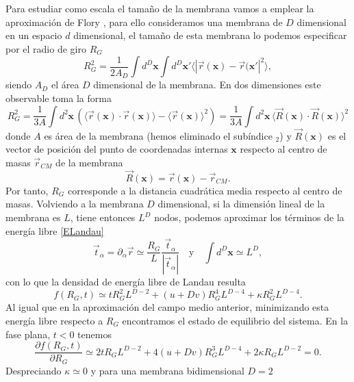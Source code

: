 Para estudiar como escala el tamaño de la membrana vamos a emplear la
aproximación de Flory \cite{Gennes:Scaling}, para ello consideramos una
membrana de $D$ dimensional en un espacio 
$d$ dimensional, el tamaño de esta membrana lo podemos especificar por el
radio de giro $R_G$
\begin{equation}
R_G^2=\frac{1}{2A_D}\int d^D\mathbf{x}\int d^D\mathbf{x}' \langle |
\vec{r}(\mathbf{x})-\vec{r}(\mathbf{x}'|^2\rangle, 
\end{equation}
siendo $A_D$ el área $D$ dimensional de la membrana. En dos dimensiones este
observable toma la forma
\begin{equation}
R_G^2=\frac{1}{3A}\int d^2\mathbf{x}\, (\langle
\vec{r}(\mathbf{x})\cdot\vec{r}(\mathbf{x})\rangle-\langle
\vec{r}(\mathbf{x})\rangle^2)=\frac{1}{3A}\int d^2\mathbf{x}\, \langle
\vec{R}(\mathbf{x})\cdot\vec{R}(\mathbf{x})\rangle^2
\end{equation} 
donde $A$ es área de la membrana (hemos eliminado el subíndice $_2$) y
$\vec{R}(\mathbf{x})$ es el vector de posición del punto de coordenadas
internas $\mathbf{x}$ respecto al centro de masas $\vec{r}_{CM}$ de la
membrana
\begin{equation*}
\vec{R}(\mathbf{x})=\vec{r}(\mathbf{x})-\vec{r}_{CM}.
\end{equation*}
Por tanto, $R_G$ corresponde a la distancia cuadrática media respecto al
centro de masas. Volviendo a la membrana $D$ dimensional, si la dimensión
lineal de la membrana es $L$, tiene entonces $L^D$ nodos, podemos
aproximar los términos \cite{Gomper:triangulated} de la energía libre \eqref{ELandau}  
\begin{equation}
\vec{t}_{\alpha}=\partial_{\alpha} \vec{r}\simeq \frac{R_G}{L}
\frac{\vec{t}_{\alpha}}{|\vec{t}_{\alpha}|}\quad \text{y}\quad \int
d^D\mathbf{x}\simeq L^D,
\end{equation}
con lo que la densidad de energía libre de Landau resulta
\begin{equation}
f(R_G,t)\simeq t R_G^2 L^{D-2}+(u+Dv) R_G^4 L^{D-4}+\kappa R_G^2 L^{D-4}.
\end{equation}
Al igual que en la aproximación del campo medio anterior, minimizando esta
energía libre respecto a $R_G$ encontramos el estado de equilibrio del sistema. En la fase
plana, $t<0$ tenemos
\begin{equation}
\frac{\partial f(R_G,t)}{\partial R_G}\simeq 2t R_G L^{D-2}+4(u+Dv) R_G^3
L^{D-4}+2 \kappa R_G L^{D-2}=0.
\end{equation}
Despreciando $\kappa\simeq 0$ y para una membrana bidimensional $D=2$
